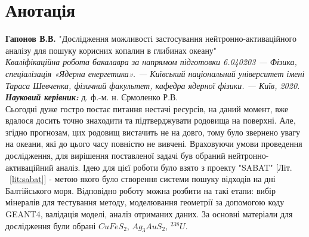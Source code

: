 \documentclass[a4paper, 14pt]{article}
\title{}
\author[1]{V. Haponov}
\author[2]{R. Yermolenko}
\affil[1]{Taras Shevchenko National University of Kiev, Kiev, Ukraine}
\affil[2]{}
\date{}
\numberwithin{equation}{section}
\numberwithin{table}{section}
\begin{document}
	

	
	
	\pagestyle{empty}
	\section*{Анотація}
	
	{\bf Гапонов В.В.} "Дослідження можливості застосування нейтронно-активаційного аналізу для пошуку корисних копалин в глибинах океану"\\
	{\itshape Кваліфікаційна робота бакалавра за напрямом підготовки 6.040203 --- Фізика, спеціалізація «Ядерна енергетика». --- Київський національний університет імені Тараса Шевченка, фізичний факультет, кафедра ядерної фізики. --- Київ, 2020.} \\
	{\itshape \bfseries Науковий керівник:} д. ф.-м. н. Єрмоленко Р.В.%
	\\[0.5cm]
	Сьогодні дуже гостро постає питання нестачі ресурсів, на даний момент, вже вдалося досить точно знаходити та підтверджувати родовища на поверхні. Але, згідно прогнозам, цих родовищ вистачить не на довго, тому було звернено увагу на океани, які до цього часу повністю не вивчені. 
	Враховуючи умови проведення дослідження, для вирішення поставленої задачі був обраний нейтронно-активаційний аналіз. Ідею для цієї роботи було взято з проекту "SABAT" [Літ. ~\ref{lit:sabat}] - метою якого було створення системи пошуку відходів на дні Балтійського моря. Відповідно роботу можна розбити на такі етапи: вибір мінералів для тестування методу, моделювання геометрії за допомогою коду GEANT4, валідація моделі, аналіз отриманих даних. За основні матеріали для дослідження були обрані $CuFeS_2$, $Ag_3AuS_2$, $^{238}U$. 
	
\end{document}
